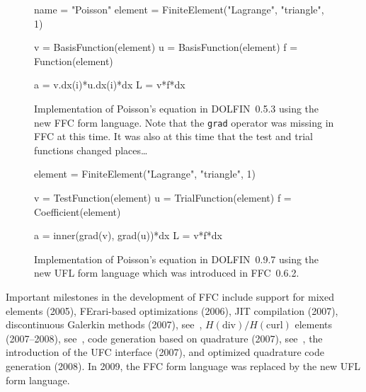 \begin{figure}
  \begin{center}
\begin{code}
  name = "Poisson"
  element = FiniteElement("Lagrange", "triangle", 1)

  v = BasisFunction(element)
  u = BasisFunction(element)
  f = Function(element)

  a = v.dx(i)*u.dx(i)*dx
  L = v*f*dx
\end{code}
  \caption{Implementation of Poisson's equation in DOLFIN~0.5.3 using
    the new FFC form language. Note that the \texttt{grad} operator
    was missing in FFC at this time. It was also at this time that the
    test and trial functions changed places\ldots}
  \label{tab:poisson,after}
  \end{center}
\end{figure}

\begin{figure}
  \begin{center}
\begin{code}
  element = FiniteElement("Lagrange", "triangle", 1)

  v = TestFunction(element)
  u = TrialFunction(element)
  f = Coefficient(element)

  a = inner(grad(v), grad(u))*dx
  L = v*f*dx
\end{code}
  \caption{Implementation of Poisson's equation in DOLFIN~0.9.7 using
    the new UFL form language which was introduced in FFC~0.6.2.}
  \label{tab:poisson,ufl}
  \end{center}
\end{figure}

Important milestones in the development of FFC include support for
mixed elements (2005), FErari-based optimizations (2006), JIT
compilation (2007), discontinuous Galerkin methods (2007),
see~\cite{OlgaardLoggEtAl2008}, $H(\mathrm{div})/H(\mathrm{curl})$
elements (2007--2008), see~\cite{RognesKirbyEtAl2008}, code generation
based on quadrature (2007), see~\cite{oelgaard:2010}, the introduction
of the UFC interface (2007), and optimized quadrature code generation
(2008). In 2009, the FFC form language was replaced by the new UFL
form language.
